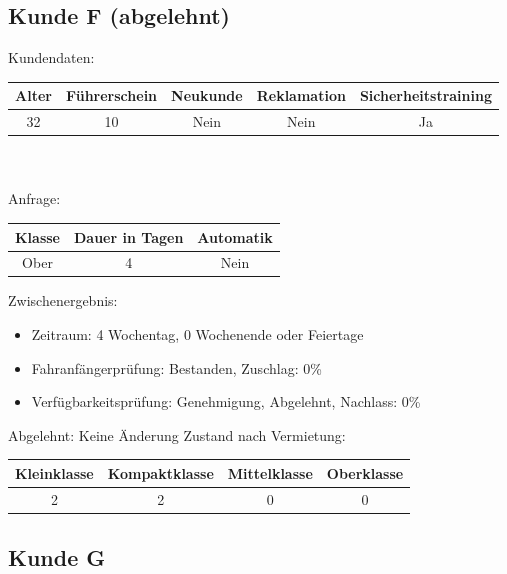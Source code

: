 \subsection{Kunde F (abgelehnt)}

Kundendaten:\\
\begin{tabular}{|c|c|c|c|c|}
	\hline \textbf{Alter} & \textbf{Führerschein} & \textbf{Neukunde} & \textbf{Reklamation} & \textbf{Sicherheitstraining} \\ 
	\hline 32 & 10 & Nein & Nein & Ja \\ 
	\hline 
\end{tabular} 
\\\\
Anfrage:\\
\begin{tabular}{|c|c|c|}
	\hline \textbf{Klasse} & \textbf{Dauer in Tagen} & \textbf{Automatik} \\ 
	\hline Ober & 4 & Nein \\ 
	\hline 
\end{tabular}

Zwischenergebnis:
\begin{itemize}
	\item Zeitraum: 4 Wochentag, 0 Wochenende oder Feiertage
	\item Fahranfängerprüfung: Bestanden, Zuschlag: 0\%
	\item Verfügbarkeitsprüfung: Genehmigung, Abgelehnt, Nachlass: 0\%
	
\end{itemize}

Abgelehnt: Keine Änderung
Zustand nach Vermietung:\\
\begin{tabular}{|c|c|c|c|}
	\hline \textbf{Kleinklasse} & \textbf{Kompaktklasse} & \textbf{Mittelklasse} & \textbf{Oberklasse}  \\ 
	\hline 2 & 2 & 0 & 0 \\ 
	\hline 
\end{tabular}

\subsection{Kunde G}

